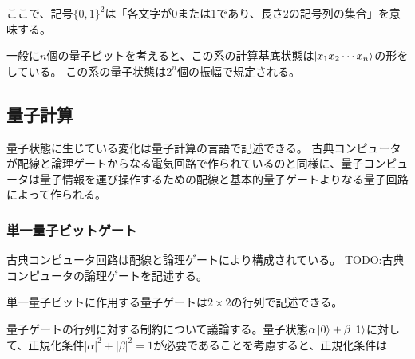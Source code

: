 \documentclass[platex,dvipdfmx]{jlreq}			%
\begin{document}
ここで、記号$\{ 0, 1 \}^2$は「各文字が0または1であり、長さ2の記号列の集合」を意味する。

一般に$n$個の量子ビットを考えると、この系の計算基底状態は$\ket{x_1 x_2 \cdots x_n}$の形をしている。
この系の量子状態は$2^n$個の振幅で規定される。


\subsection{量子計算}
量子状態に生じている変化は量子計算の言語で記述できる。
古典コンピュータが配線と論理ゲートからなる電気回路で作られているのと同様に、量子コンピュータは量子情報を運び操作するための配線と基本的量子ゲートよりなる量子回路によって作られる。

\subsubsection{単一量子ビットゲート}
古典コンピュータ回路は配線と論理ゲートにより構成されている。
TODO:古典コンピュータの論理ゲートを記述する。


単一量子ビットに作用する量子ゲートは$2 \times 2$の行列で記述できる。

量子ゲートの行列に対する制約について議論する。量子状態$\alpha \ket{0} + \beta \ket{1}$に対して、正規化条件$|\alpha|^2 + |\beta|^2 = 1$が必要であることを考慮すると、正規化条件は
    
\end{document}
